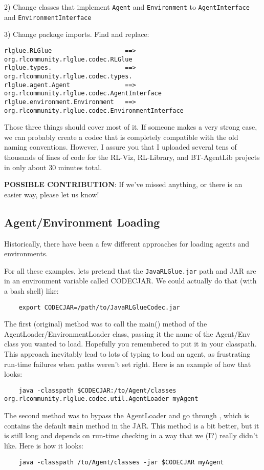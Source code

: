\documentclass[11pt]{article}
\begin{document}
2) Change classes that implement \texttt{Agent} and \texttt{Environment} to \texttt{AgentInterface} and \texttt{EnvironmentInterface}

3) Change package imports.  Find and replace:
\begin{verbatim}
rlglue.RLGlue                    ==>    org.rlcommunity.rlglue.codec.RLGlue
rlglue.types.                    ==>    org.rlcommunity.rlglue.codec.types.
rlglue.agent.Agent               ==>    org.rlcommunity.rlglue.codec.AgentInterface
rlglue.environment.Environment   ==>    org.rlcommunity.rlglue.codec.EnvironmentInterface
\end{verbatim}

Those three things should cover most of it.  If someone makes a very strong case, we can probably create a codec that is completely compatible with the old naming conventions.  However, I assure you that I uploaded
several tens of thousands of lines of code for the RL-Viz, RL-Library, and BT-AgentLib projects in only about 30 minutes total.

\textbf{POSSIBLE CONTRIBUTION}: If we've missed anything, or there is an easier way, please let us know!

\subsection{Agent/Environment Loading}
Historically, there have been a few different approaches for loading agents and environments.

For all these examples, lets pretend that the \texttt{JavaRLGlue.jar} path and JAR are in an environment variable called CODECJAR.  We could actually do that (with a bash shell) like:
\begin{verbatim}
	export CODECJAR=/path/to/JavaRLGlueCodec.jar
\end{verbatim}


The first (original) method was to call the main() method of the AgentLoader/EnvironmentLoader class, passing it the name of the 
Agent/Env class you wanted to load.  Hopefully you remembered to put it in your classpath.  This approach inevitably lead to lots of typing to load an agent, as frustrating run-time failures when paths weren't set right.
Here is an example of how that looks:
\begin{verbatim}
	java -classpath $CODECJAR:/to/Agent/classes org.rlcommunity.rlglue.codec.util.AgentLoader myAgent
\end{verbatim}

The second method was to bypass the AgentLoader and go through , 
which is contains the default \texttt{main} method in the JAR.  This method is a bit better, but it is still long and depends on run-time checking in a way that we (I?) really didn't like.  Here is how it looks:
\begin{verbatim}
	java -classpath /to/Agent/classes -jar $CODECJAR myAgent
\end{verbatim}
\end{document}
